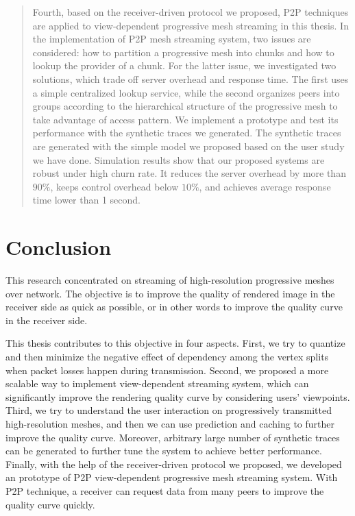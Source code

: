 \documentclass[11pt, a4paper]{report}
\begin{document}
\begin{abstract}
    Fourth, based on the receiver-driven protocol we proposed, 
    P2P techniques are applied to view-dependent progressive mesh streaming in this thesis. 
    In the implementation of P2P mesh streaming system,
    two issues are considered: how to partition a progressive mesh into chunks and 
    how to lookup the provider of a chunk. For the latter issue, we investigated 
    two solutions, which trade off server overhead and response time. The first
    uses a simple centralized lookup service, while the second organizes peers into
    groups according to the hierarchical structure of the progressive mesh to 
    take advantage of access pattern. We implement a prototype and test its performance
    with the synthetic traces we generated. The synthetic traces are generated with the simple model we proposed based on the user study we have done. 
    Simulation results show that our proposed systems are robust under high churn rate. It reduces the server overhead
    by more than $90\%$, keeps control overhead below $10\%$, and achieves
    average response time lower than 1 second.
\end{abstract}
   

%
%
%
%
%

\chapter{Conclusion}
\label{c:conclusion}
This research concentrated on streaming of high-resolution progressive meshes over network. 
The objective is to improve the quality of rendered image in the receiver side
as quick as possible, or in other words to improve the quality curve in the receiver
side. 

This thesis contributes to this objective in four aspects.
First, we try to quantize and then minimize the negative effect of dependency
among the vertex splits when packet losses happen during transmission.
Second, we proposed a more scalable way to implement view-dependent streaming
system, which can significantly improve the rendering quality curve by considering 
users' viewpoints. 
Third, we try to understand the user interaction on progressively transmitted 
high-resolution meshes, and then we can use prediction and caching to further 
improve the quality curve. Moreover, arbitrary large number of synthetic traces 
can be generated to further tune the system to achieve better performance.
Finally, with the help of the receiver-driven protocol we proposed, we developed 
an prototype of P2P view-dependent progressive mesh streaming system. With P2P
technique, a receiver can request data from many peers to improve the quality curve 
quickly.
\end{document}
